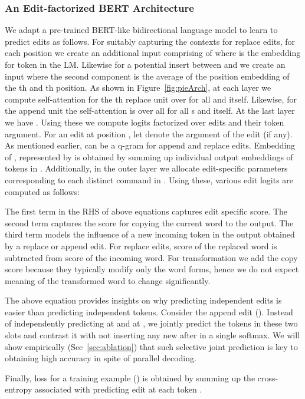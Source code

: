 \documentclass[11pt,a4paper]{article}
\begin{document}
\subsubsection{An Edit-factorized BERT Architecture}
\label{sec:faclogic}
We adapt a pre-trained BERT-like bidirectional language model to learn to predict edits as follows.  For suitably capturing the contexts for replace edits, for each position  we create an additional input comprising of  where   is the embedding for  token 
in the LM.  Likewise for a potential insert between  and  we create an input   where the second component is the average of the position embedding of the th and th position.  As shown in Figure~\ref{fig:pieArch}, at each layer  we compute self-attention for the th replace unit  over  for all  and itself. 
Likewise, for the append unit  the self-attention is over all  for all s and itself. 
At the last layer we have .  Using these we compute logits factorized over edits and their token argument.  For an edit  at position , let  denote the argument of the edit (if any). As mentioned earlier,  can be a q-gram for append and replace edits. Embedding of , represented by  is obtained by summing up individual output embeddings of tokens in . 
Additionally, in the outer layer we allocate edit-specific parameters  corresponding to each distinct command in .  
Using these, various edit logits are computed as follows: 


The first term in the RHS of above equations captures edit specific score. 
The second term captures the score for copying the current word  to the output. The third term models the influence of a new incoming token in the output obtained by a replace or append edit. For replace edits, score of the replaced word is subtracted from score of the incoming word. 
For transformation we add the copy score because they typically modify only the word forms, hence we do not expect meaning of the transformed word to change significantly.

The above equation provides insights on why predicting independent edits is easier than predicting independent tokens.  Consider the append edit  ().  Instead of independently predicting  at  and  at , we jointly predict the tokens in these two slots and contrast it with not inserting any new  after  in a single softmax. We will show empirically (Sec~\ref{sec:ablation}) that such selective joint prediction is key to obtaining high accuracy in spite of parallel decoding.

Finally, loss for a training example () is obtained by summing up the cross-entropy associated with predicting edit  at each token . 
\end{document}
